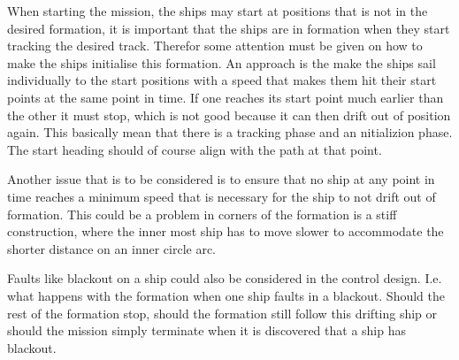When starting the mission, the ships may start at positions that
is not in the desired formation, it is important that the ships are in
formation when they start tracking the desired track. Therefor some
attention must be given on how to make the ships initialise this
formation. An approach is the make the ships sail individually to the
start positions with a speed that makes them hit their start points at
the same point in time. If one reaches its start point much earlier
than the other it must stop, which is not good because it can then
drift out of position again. This basically mean that there is a
tracking phase and an nitializion phase. The start heading should of
course align with the path at that point.

Another issue that is to be considered is to ensure that no ship at
any point in time reaches a minimum speed that is necessary for the
ship to not drift out of formation. This could be a problem in corners
of the formation is a stiff construction, where the inner most ship
has to move slower to accommodate the shorter distance on an inner
circle arc.

Faults like blackout on a ship could also be considered in the control
design. I.e. what happens with the formation when one ship faults in a
blackout. Should the rest of the formation stop, should the formation
still follow this drifting ship or should the mission simply terminate
when it is discovered that a ship has blackout.
